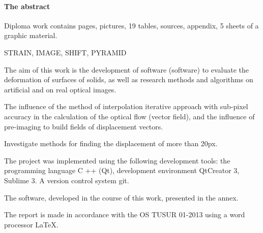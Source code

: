 \newpage
{}
\paragraph{\hfill The abstract \hfill}
Diploma work contains  pages,  pictures, 19 tables,  sources,  appendix, 5 sheets of a graphic material.

STRAIN, IMAGE, SHIFT, PYRAMID

The aim of this work is the development of software (software) to evaluate the deformation of surfaces of solids, as well as research methods and algorithms on artificial and on real optical images.

The influence of the method of interpolation iterative approach with sub-pixel accuracy in the calculation of the optical flow (vector field), and the influence of pre-imaging to build fields of displacement vectors.

Investigate methods for finding the displacement of more than 20px.

 

The project was implemented using the following development tools: the programming language C ++ (Qt), development environment QtCreator 3, Sublime 3. A version control system git.

The software, developed in the course of this work, presented in the annex.

The report is made in accordance with the OS TUSUR 01-2013 using a word processor \LaTeX.